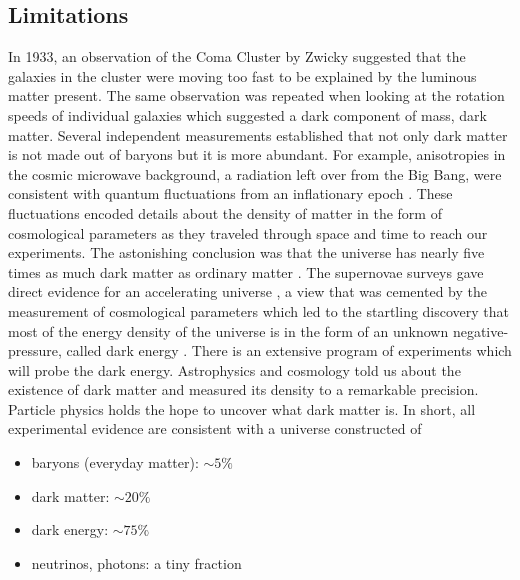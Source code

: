 \subsection*{Limitations}
In 1933, an observation of the Coma Cluster by Zwicky suggested that the galaxies in the cluster were moving too fast to be explained 
by the luminous matter present\cite{1933AcHPh}. 
The same observation was repeated when looking at the rotation speeds of individual galaxies which 
suggested a dark component of mass, dark matter. 
Several independent measurements established that 
not only dark matter is not made out of baryons but it is more 
abundant. 
For example, anisotropies in the cosmic microwave background, a radiation 
left over from the Big Bang, were consistent with 
quantum fluctuations from an inflationary epoch \cite{Hu:2001bc,2009AIPC}. 
These fluctuations encoded details about the density of matter 
in the form of 
cosmological parameters as they traveled through space and time to reach 
our experiments.
The astonishing conclusion was that the universe has nearly five times 
as much dark matter as ordinary matter \cite{Bertone:2004pz}.
The supernovae surveys gave direct evidence for an accelerating universe
 \cite{Perlmutter:1998np},
a view that was cemented by the measurement of cosmological parameters
\cite{Adam:2015rua,Ade:2015xua}
which led to the startling discovery that most of the energy density of 
the universe is in the 
form of an unknown negative-pressure, called dark energy \cite{Scranton:2003in}.
There is an extensive program of experiments 
which will probe the dark energy. %
Astrophysics and cosmology told us about 
the existence of dark matter and measured its density to a remarkable 
precision. Particle physics holds the hope to uncover what dark matter is.
In short, all experimental evidence are consistent with a universe 
constructed of 
\begin{itemize}
\item baryons (everyday matter): $\sim 5\%$ 
\item dark matter: $\sim 20\%$ 
\item dark energy: $\sim 75\%$ 
\item neutrinos, photons: a tiny fraction
\end{itemize}


